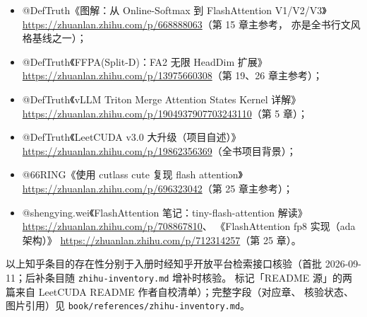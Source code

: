 \begin{itemize}
  \item @DefTruth《图解：从 Online-Softmax 到 FlashAttention V1/V2/V3》
        \url{https://zhuanlan.zhihu.com/p/668888063}（第 15 章主参考，
        亦是全书行文风格基线之一）；
  \item @DefTruth《FFPA(Split-D)：FA2 无限 HeadDim 扩展》
        \url{https://zhuanlan.zhihu.com/p/13975660308}（第 19、26 章主参考）；
  \item @DefTruth《vLLM Triton Merge Attention States Kernel 详解》
        \url{https://zhuanlan.zhihu.com/p/1904937907703243110}（第 5 章）；
  \item @DefTruth《LeetCUDA v3.0 大升级（项目自述）》
        \url{https://zhuanlan.zhihu.com/p/19862356369}（全书项目背景）；
  \item @66RING《使用 cutlass cute 复现 flash attention》
        \url{https://zhuanlan.zhihu.com/p/696323042}（第 25 章主参考）；
  \item @shengying.wei《FlashAttention 笔记：tiny-flash-attention 解读》
        \url{https://zhuanlan.zhihu.com/p/708867810}、
        《FlashAttention fp8 实现（ada 架构）》
        \url{https://zhuanlan.zhihu.com/p/712314257}（第 25 章）。
\end{itemize}

以上知乎条目的存在性分别于入册时经知乎开放平台检索接口核验（首批
2026-09-11；后补条目随 \texttt{zhihu-inventory.md} 增补时核验。
标记「README 源」的两篇来自 LeetCUDA README 作者自校清单）；完整字段（对应章、
核验状态、图片引用）见 \texttt{book/\allowbreak{}references/\allowbreak{}zhihu-inventory.\allowbreak{}md}。

\emergencystretch=0pt
\fussy
